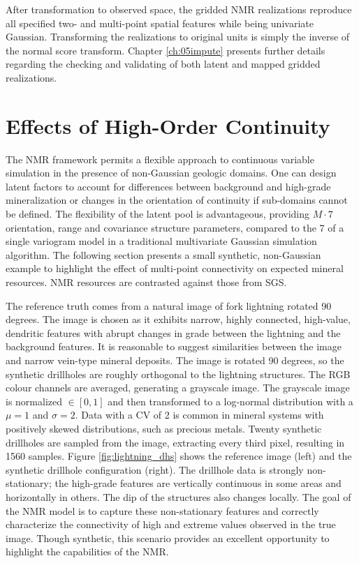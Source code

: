 After transformation to observed space, the gridded \gls{NMR} realizations reproduce all specified two- and multi-point spatial features while being univariate Gaussian. Transforming the realizations to original units is simply the inverse of the normal score transform. Chapter \ref{ch:05impute} presents further details regarding the checking and validating of both latent and mapped gridded realizations.


\FloatBarrier
\section{Effects of High-Order Continuity}
\label{sec:03effect}

The \gls{NMR} framework permits a flexible approach to continuous variable simulation in the presence of non-Gaussian geologic domains. One can design latent factors to account for differences between background and high-grade mineralization or changes in the orientation of continuity if sub-domains cannot be defined. The flexibility of the latent pool is advantageous, providing $M \cdot 7$ orientation, range and covariance structure parameters, compared to the 7 of a single variogram model in a traditional multivariate Gaussian simulation algorithm. The following section presents a small synthetic, non-Gaussian example to highlight the effect of multi-point connectivity on expected mineral resources. \Gls{NMR} resources are contrasted against those from \gls{SGS}.

The reference truth comes from a natural image of fork lightning rotated 90 degrees. The image is chosen as it exhibits narrow, highly connected, high-value, dendritic features with abrupt changes in grade between the lightning and the background features. It is reasonable to suggest similarities between the image and narrow vein-type mineral deposits. The image is rotated 90 degrees, so the synthetic drillholes are roughly orthogonal to the lightning structures. The \gls{RGB} colour channels are averaged, generating a grayscale image. The grayscale image is normalized $\in [0, 1]$ and then transformed to a log-normal distribution with a $\mu = 1$ and $\sigma = 2$. Data with a \gls{CV} of 2 is common in mineral systems with positively skewed distributions, such as precious metals. Twenty synthetic drillholes are sampled from the image, extracting every third pixel, resulting in 1560 samples. Figure \ref{fig:lightning_dhs} shows the reference image (left) and the synthetic drillhole configuration (right). The drillhole data is strongly non-stationary; the high-grade features are vertically continuous in some areas and horizontally in others. The dip of the structures also changes locally. The goal of the \gls{NMR} model is to capture these non-stationary features and correctly characterize the connectivity of high and extreme values observed in the true image. Though synthetic, this scenario provides an excellent opportunity to highlight the capabilities of the \gls{NMR}.

